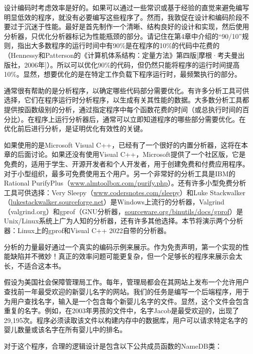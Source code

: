 
设计编码时考虑效率是好的。如果可以通过一些常识或基于经验的直觉来避免编写明显低效的程序，就没有必要编写这些程序了。然而，我敦促在设计和编码阶段不要过于沉迷于性能。最好是首先制作一个清晰、结构良好的设计和实现，然后使用分析器，只优化分析器标记为性能瓶颈的部分。请记住在第4章中介绍的“90/10”规则，指出大多数程序的运行时间中有90\%是在程序的10\%的代码中花费的（Hennessy和Patterson的《计算机体系结构：定量方法》第四版[摩根·考夫曼出版社，2006年]）。所以可以优化90\%的代码，但仍然只能将程序的运行时间提高10\%。显然，想要优化的是在特定工作负载下程序运行时，最频繁执行的部分。

通常很有帮助的是分析程序，以确定哪些代码部分需要优化。有许多分析工具可供选择，它们在程序运行时分析程序，以生成有关其性能的数据。大多数分析工具都提供按函数级别的分析，通过指定程序中每个函数花费的时间（或总执行时间的百分比）。在程序上运行分析器后，通常可以立即知道程序的哪些部分需要优化。在优化前后进行分析，是证明优化有效性的关键。

如果使用的是Microsoft Visual C++，已经有了一个很好的内置分析器，这将在本章的后面讨论。如果还没有使用Visual C++，Microsoft提供了一个社区版，它是免费的，适用于学生、开源开发者和个人开发者，用于创建免费和付费应用程序。对于小型组织，最多可免费使用五个用户。另一个非常好的分析工具是IBM的Rational PurifyPlus（\url{www.almtoolbox.com/purify.php}）。还有许多小型免费分析工具可供选择：Very Sleepy（\url{www.codersnotes.com/sleepy}）和Luke Stackwalker（\url{lukestackwalker.sourceforge.net}）是Windows上流行的分析器，Valgrind（valgrind.org）和gprof（GNU分析器，\url{sourceware.org/binutils/docs/gprof}）是Unix/Linux系统上广为人知的分析器，还有许多其他选择。本节将演示两个分析器：Linux上的gprof和Visual C++ 2022自带的分析器。


分析的力量最好通过一个真实的编码示例来展示。作为免责声明，第一个实现的性能缺陷并不微妙！真正的效率问题可能更复杂，但一个足够长的程序来展示会太长，不适合这本书。

假设为美国社会保障管理局工作。每年，管理局都会在其网站上发布一个允许用户查找前一年最受欢迎的新婴儿名字的网站。我们的任务是编写一个后端程序，用于为用户查找名字，输入是一个包含每个新婴儿名字的文件。显然，这个文件会包含重复的名字。例如，在2003年男孩的文件中，名字Jacob是最受欢迎的，出现了29,195次。程序必须读取该文件以构建内存中的数据库，用户可以请求特定名字的婴儿数量或该名字在所有婴儿中的排名。


对于这个程序，合理的逻辑设计是包含以下公共成员函数的NameDB类：

